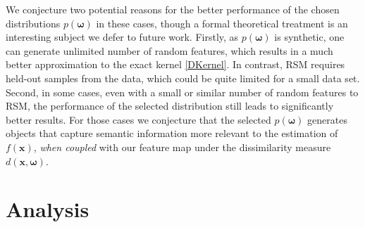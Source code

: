 \documentclass{article}
\newcommand{\1}{\mathbf{1}}
\newcommand{\bx}{\boldsymbol{x}}
\newcommand{\bomega}{\boldsymbol{\omega}}
\begin{document}
We conjecture two potential reasons for the better performance of the chosen distributions $p(\bomega)$ in these cases, though a formal theoretical treatment is an interesting subject we defer to future work.
Firstly, as $p(\bomega)$ is synthetic, one can generate unlimited number of random features, which results in a much better approximation to the exact kernel \eqref{DKernel}. In contrast, RSM requires held-out samples from the data, which could be quite limited for a small data set.
Second, in some cases, even with a small or similar number of random features to RSM, the performance of the selected distribution still leads to significantly better results. For those cases we conjecture that the selected $p(\bomega)$ generates objects that capture semantic information more relevant to the estimation of $f(\bx)$, \emph{when coupled} with our feature map under the dissimilarity measure $d(\bx,\bomega)$. 


\section{Analysis}
\label{sec:analysis}
\end{document}

